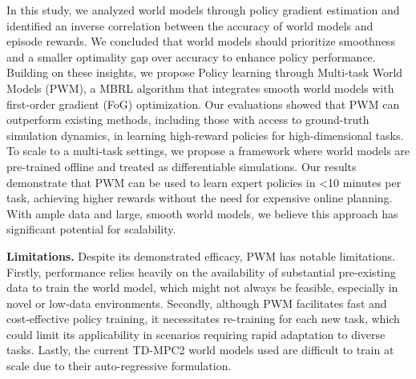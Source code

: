 \documentclass{article} %
\begin{document}

In this study, we analyzed world models through policy gradient estimation and identified an inverse correlation between the accuracy of world models and episode rewards. We concluded that world models should prioritize smoothness and a smaller optimality gap over accuracy to enhance policy performance. Building on these insights, we propose Policy learning through Multi-task World Models (PWM), a MBRL algorithm that integrates smooth world models with first-order gradient (FoG) optimization. Our evaluations showed that PWM can outperform existing methods, including those with access to ground-truth simulation dynamics, in learning high-reward policies for high-dimensional tasks. To scale to a multi-task settings, we propose a framework where world models are pre-trained offline and treated as differentiable simulations. Our results demonstrate that PWM can be used to learn expert policies in <10 minutes per task, achieving higher rewards without the need for expensive online planning. With ample data and large, smooth world models, we believe this approach has significant potential for scalability.

\textbf{Limitations.} Despite its demonstrated efficacy, PWM has notable limitations. Firstly, performance relies heavily on the availability of substantial pre-existing data to train the world model, which might not always be feasible, especially in novel or low-data environments. Secondly, although PWM facilitates fast and cost-effective policy training, it necessitates re-training for each new task, which could limit its applicability in scenarios requiring rapid adaptation to diverse tasks. Lastly, the current TD-MPC2 world models used are difficult to train at scale due to their auto-regressive formulation.
\end{document}

